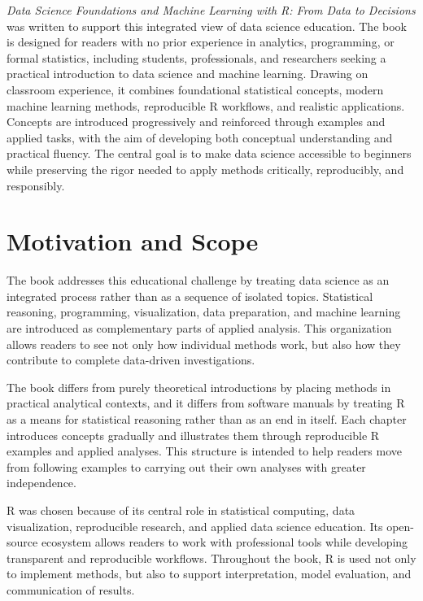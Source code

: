 \documentclass[
  letterpaper,
]{svmono}
\numberwithin{example}{subsection}
\begin{document}
\emph{Data Science Foundations and Machine Learning with R: From Data to
Decisions} was written to support this integrated view of data science
education. The book is designed for readers with no prior experience in
analytics, programming, or formal statistics, including students,
professionals, and researchers seeking a practical introduction to data
science and machine learning. Drawing on classroom experience, it
combines foundational statistical concepts, modern machine learning
methods, reproducible R workflows, and realistic applications. Concepts
are introduced progressively and reinforced through examples and applied
tasks, with the aim of developing both conceptual understanding and
practical fluency. The central goal is to make data science accessible
to beginners while preserving the rigor needed to apply methods
critically, reproducibly, and responsibly.

\section*{Motivation and Scope}\label{motivation-and-scope}


The book addresses this educational challenge by treating data science
as an integrated process rather than as a sequence of isolated topics.
Statistical reasoning, programming, visualization, data preparation, and
machine learning are introduced as complementary parts of applied
analysis. This organization allows readers to see not only how
individual methods work, but also how they contribute to complete
data-driven investigations.

The book differs from purely theoretical introductions by placing
methods in practical analytical contexts, and it differs from software
manuals by treating R as a means for statistical reasoning rather than
as an end in itself. Each chapter introduces concepts gradually and
illustrates them through reproducible R examples and applied analyses.
This structure is intended to help readers move from following examples
to carrying out their own analyses with greater independence.

R was chosen because of its central role in statistical computing, data
visualization, reproducible research, and applied data science
education. Its open-source ecosystem allows readers to work with
professional tools while developing transparent and reproducible
workflows. Throughout the book, R is used not only to implement methods,
but also to support interpretation, model evaluation, and communication
of results.
\end{document}
